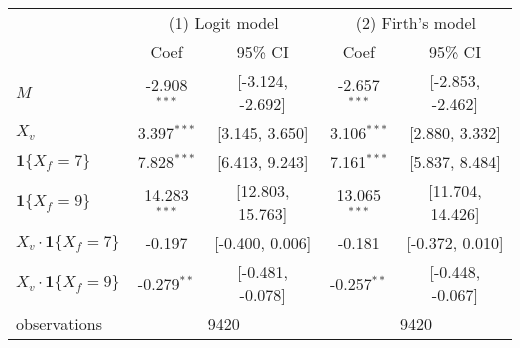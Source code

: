 \begin{tabular}{lcccc}
  \hline
   & \multicolumn{2}{c}{(1) Logit model} & \multicolumn{2}{c}{(2) Firth's model} \\ & Coef & 95\% CI & Coef & 95\% CI \\ \hline
$M$ & -2.908$^{***}$ & [-3.124, -2.692] & -2.657$^{***}$ & [-2.853, -2.462] \\ 
  $X_v$ & 3.397$^{***}$ & [3.145, 3.650] & 3.106$^{***}$ & [2.880, 3.332] \\ 
  $\textbf{1}\{X_f = 7\}$ & 7.828$^{***}$ & [6.413, 9.243] & 7.161$^{***}$ & [5.837, 8.484] \\ 
  $\textbf{1}\{X_f = 9\}$ & 14.283$^{***}$ & [12.803, 15.763] & 13.065$^{***}$ & [11.704, 14.426] \\ 
  $X_v\cdot\textbf{1}\{X_f = 7\}$ & -0.197 & [-0.400, 0.006] & -0.181 & [-0.372, 0.010] \\ 
  $X_v\cdot\textbf{1}\{X_f = 9\}$ & -0.279$^{**}$ & [-0.481, -0.078] & -0.257$^{**}$ & [-0.448, -0.067] \\ 
   \hline observations & \multicolumn{2}{c}{9420} & \multicolumn{2}{c}{9420} \\ \hline
\end{tabular}

